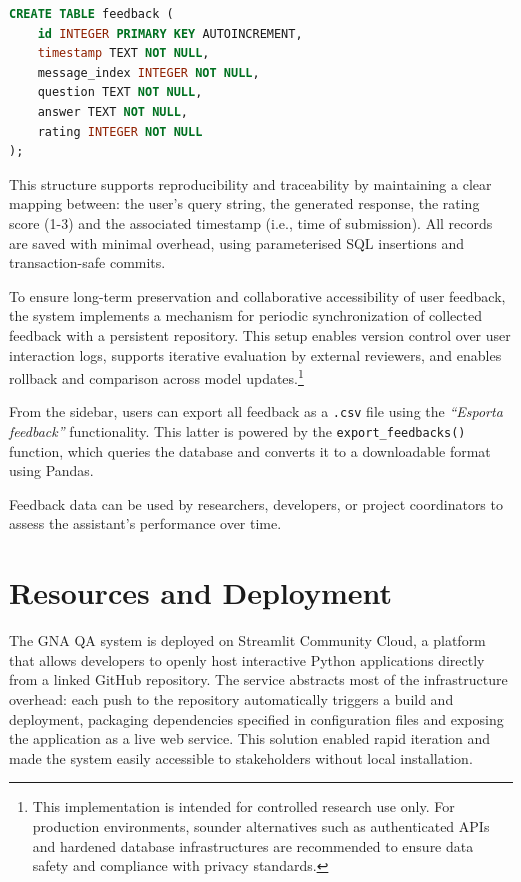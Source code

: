 \begin{spacing}{1.5}
\begin{lstlisting}[language=SQL,
                  frame=none,
                   caption={SQL schema of the feedback database.},
                   captionpos=b,
                   label={lst:sql_schema},
  xleftmargin=0.2\textwidth,
  xrightmargin=0.1\textwidth]
CREATE TABLE feedback (
    id INTEGER PRIMARY KEY AUTOINCREMENT,
    timestamp TEXT NOT NULL,
    message_index INTEGER NOT NULL,
    question TEXT NOT NULL,
    answer TEXT NOT NULL,
    rating INTEGER NOT NULL
);
\end{lstlisting}

This structure supports reproducibility and traceability by maintaining a clear mapping between: the user's query string, the generated response, the rating score (1-3) and the associated timestamp (i.e., time of submission). All records are saved with minimal overhead, using parameterised SQL insertions and transaction-safe commits.

To ensure long-term preservation and collaborative accessibility of user feedback, the system implements a mechanism for periodic synchronization of collected feedback with a persistent repository. This setup enables version control over user interaction logs, supports iterative evaluation by external reviewers, and enables rollback and comparison across model updates.\footnote{This implementation is intended for controlled research use only. For production environments, sounder alternatives such as authenticated APIs and hardened database infrastructures are recommended to ensure data safety and compliance with privacy standards.}

From the sidebar, users can export all feedback as a \texttt{.csv} file using the \textit{``Esporta feedback''} functionality. This latter is powered by the \texttt{export\_feedbacks()} function, which queries the database and converts it to a downloadable format using Pandas. 

Feedback data can be used by researchers, developers, or project coordinators to assess the assistant's performance over time.


\section{Resources and Deployment}
The GNA QA system is deployed on Streamlit Community Cloud, a platform that allows developers to openly host interactive Python applications directly from a linked GitHub repository. The service abstracts most of the infrastructure overhead: each push to the repository automatically triggers a build and deployment, packaging dependencies specified in configuration files and exposing the application as a live web service. This solution enabled rapid iteration and made the system easily accessible to stakeholders without local installation.


\end{spacing}
